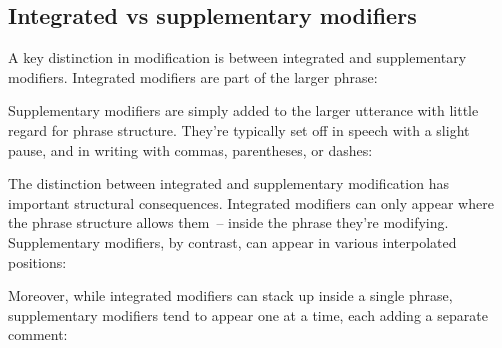 \ea\label{ex:adv-order}
   \z
\z

\subsection{Integrated vs supplementary modifiers}

A key distinction in modification is between integrated and supplementary modifiers. Integrated modifiers are part of the larger phrase:

\ea\label{ex:restrictive}
   \z
\z

Supplementary modifiers are simply added to the larger utterance with little regard for phrase structure. They're typically set off in speech with a slight pause, and in writing with commas, parentheses, or dashes:

\ea\label{ex:supplement}
    \z
\z

The distinction between integrated and supplementary modification has important structural consequences. Integrated modifiers can only appear where the phrase structure allows them~-- inside the phrase they're modifying. Supplementary modifiers, by contrast, can appear in various interpolated positions:

\ea\label{ex:supplement-position}
    \z
\z

Moreover, while integrated modifiers can stack up inside a single phrase, supplementary modifiers tend to appear one at a time, each adding a separate comment:

\ea\label{ex:supplement-stack}
    \z
\z


